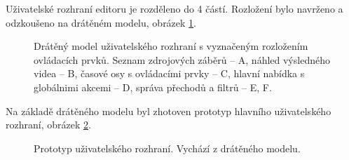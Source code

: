 Uživatelské rozhraní editoru je rozděleno do 4 částí. Rozložení bylo navrženo a odzkoušeno na drátěném modelu, obrázek \ref{img:wireframe}.
\begin{figure}[h]
	\centering
	\caption{Drátěný model uživatelského rozhraní s vyznačeným rozložením ovládacích prvků. Seznam zdrojových záběrů -- A, náhled výsledného videa -- B, časové osy s ovládacími prvky -- C, hlavní nabídka s globálnimi akcemi -- D, správa přechodů a filtrů -- E, F.}\label{img:wireframe}
\end{figure}
Na základě drátěného modelu byl zhotoven prototyp hlavního uživatelského rozhraní, obrázek \ref{img:mockup}.
\begin{figure}[!h]
	\centering
	\caption{Prototyp uživatelského rozhraní. Vychází z drátěného modelu.}\label{img:mockup}
\end{figure}

